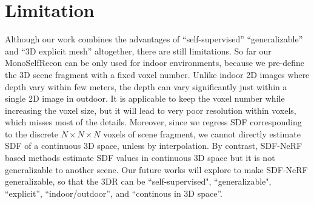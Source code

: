 \section{Limitation}
Although our work combines the advantages of ``self-supervised'' ``generalizable'' and ``3D explicit mesh'' altogether, there are still limitations. So far our MonoSelfRecon can be only used for indoor environments, because we pre-define the 3D scene fragment with a fixed voxel number. Unlike indoor 2D images where depth vary within few meters, the depth can vary significantly just within a single 2D image in outdoor. It is applicable to keep the voxel number while increasing the voxel size, but it will lead to very poor resolution within voxels, which misses most of the details. Moreover, since we regress SDF corresponding to the discrete $N\times N\times N$ voxels of scene fragment, we cannot directly estimate SDF of a continuous 3D space, unless by interpolation. By contrast, SDF-NeRF based methods estimate SDF values in continuous 3D space but it is not generalizable to another scene. Our future works will explore to make SDF-NeRF generalizable, so that the 3DR can be ``self-supervised", ``generalizable", ``explicit'', ``indoor/outdoor'', and ``continous in 3D space''. 

